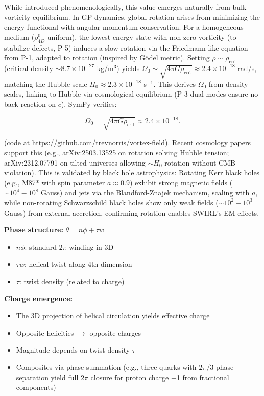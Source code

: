 While introduced phenomenologically, this value emerges naturally from bulk vorticity equilibrium. In GP dynamics, global rotation arises from minimizing the energy functional with angular momentum conservation. For a homogeneous medium ($\rho_{4D}^0$ uniform), the lowest-energy state with non-zero vorticity (to stabilize defects, P-5) induces a slow rotation via the Friedmann-like equation from P-1, adapted to rotation (inspired by G\"{o}del metric). Setting $\rho \sim \rho_{\text{crit}}$ (critical density $\sim 8.7 \times 10^{-27}$ kg/m$^3$) yields $\Omega_0 \sim \sqrt{4\pi G \rho_{\text{crit}}} \approx 2.4 \times 10^{-18}$ rad/s, matching the Hubble scale $H_0 \approx 2.3 \times 10^{-18}$ s$^{-1}$. This derives $\Omega_0$ from density scales, linking to Hubble via cosmological equilibrium (P-3 dual modes ensure no back-reaction on $c$). SymPy verifies:

\begin{equation}
\Omega_0 = \sqrt{4 \pi G \rho_{\text{crit}}} \approx 2.4 \times 10^{-18}.
\end{equation}

(code at \url{https://github.com/trevnorris/vortex-field}). Recent cosmology papers support this (e.g., arXiv:2503.13525 on rotation solving Hubble tension; arXiv:2312.07791 on tilted universes allowing $\sim H_0$ rotation without CMB violation). This is validated by black hole astrophysics: Rotating Kerr black holes (e.g., M87* with spin parameter $a \approx0.9$) exhibit strong magnetic fields ($\sim 10^4 - 10^8$ Gauss) and jets via the Blandford-Znajek mechanism, scaling with $a$, while non-rotating Schwarzschild black holes show only weak fields ($\sim 10^2 - 10^3$ Gauss) from external accretion, confirming rotation enables SWIRL's EM effects.

\textbf{Phase structure:} $\theta = n\phi + \tau w$
\begin{itemize}
\item $n\phi$: standard $2\pi$ winding in 3D
\item $\tau w$: helical twist along 4th dimension
\item $\tau$: twist density (related to charge)
\end{itemize}

\textbf{Charge emergence:}
\begin{itemize}
\item The 3D projection of helical circulation yields effective charge
\item Opposite helicities $\to$ opposite charges
\item Magnitude depends on twist density $\tau$
\item Composites via phase summation (e.g., three quarks with $2\pi/3$ phase separation yield full $2\pi$ closure for proton charge +1 from fractional components)
\end{itemize}

